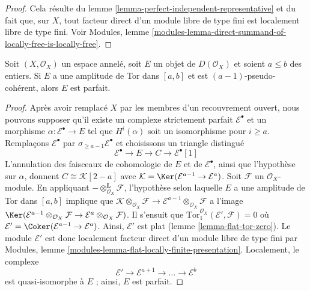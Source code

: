 \begin{proof}
Cela résulte du lemme \ref{lemma-perfect-independent-representative} et du fait que, sur $X$, tout facteur direct d'un module libre de type fini est localement libre de type fini. Voir Modules, lemme \ref{modules-lemma-direct-summand-of-locally-free-is-locally-free}.
\end{proof}

\begin{lemma}

\label{lemma-perfect-precise}
Soit $(X, \mathcal{O}_X)$ un espace annelé, soit $E$ un objet de $D(\mathcal{O}_X)$ et soient $a \leq b$ des entiers. Si $E$ a une amplitude de Tor dans $[a, b]$ et est $(a - 1)$-pseudo-cohérent, alors $E$ est parfait.
\end{lemma}

\begin{proof}

Après avoir remplacé $X$ par les membres d'un recouvrement ouvert, nous pouvons supposer qu'il existe un complexe strictement parfait $\mathcal{E}^\bullet$ et un morphisme
$\alpha : \mathcal{E}^\bullet \to E$ tel que $H^i(\alpha)$ soit un isomorphisme pour $i \geq a$. Remplaçons $\mathcal{E}^\bullet$ par
$\sigma_{\geq a - 1}\mathcal{E}^\bullet$ et choisissons un triangle distingué
$$
\mathcal{E}^\bullet \to E \to C \to \mathcal{E}^\bullet[1]
$$
L'annulation des faisceaux de cohomologie de $E$ et de $\mathcal{E}^\bullet$,
ainsi que l'hypothèse sur $\alpha$, donnent $C \cong \mathcal{K}[2 - a]$ avec
$\mathcal{K} = \Ker(\mathcal{E}^{a - 1} \to \mathcal{E}^a)$. Soit $\mathcal{F}$ un $\mathcal{O}_X$-module. En appliquant $- \otimes_{\mathcal{O}_X}^\mathbf{L} \mathcal{F}$,
l'hypothèse selon laquelle $E$ a une amplitude de Tor dans $[a, b]$
implique que $\mathcal{K} \otimes_{\mathcal{O}_X} \mathcal{F} \to
\mathcal{E}^{a - 1} \otimes_{\mathcal{O}_X} \mathcal{F}$ a l'image
$\Ker(\mathcal{E}^{a - 1} \otimes_{\mathcal{O}_X} \mathcal{F}
\to \mathcal{E}^a \otimes_{\mathcal{O}_X} \mathcal{F})$. Il s'ensuit que $\text{Tor}_1^{\mathcal{O}_X}(\mathcal{E}', \mathcal{F}) = 0$
où $\mathcal{E}' = \Coker(\mathcal{E}^{a - 1} \to \mathcal{E}^a)$. Ainsi, $\mathcal{E}'$ est plat (lemme \ref{lemma-flat-tor-zero}). Le module $\mathcal{E}'$ est donc localement facteur direct d'un module libre de type fini par Modules, lemme \ref{modules-lemma-flat-locally-finite-presentation}. Localement, le complexe
$$
\mathcal{E}' \to \mathcal{E}^{a + 1} \to \ldots \to \mathcal{E}^b
$$
est quasi-isomorphe à $E$ ; ainsi, $E$ est parfait.

\end{proof}


